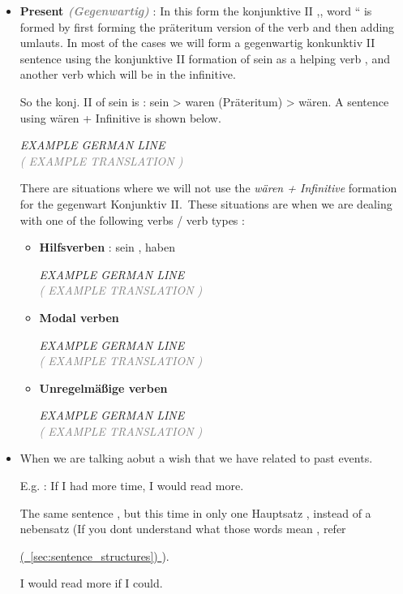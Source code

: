 \documentclass[a4paper,twocolumn,10pt]{article}
\newcommand{\newpar}
{\par \vspace{0.3cm}}
\newcommand{\refsec}[1]
{
	\hyperref[sec:#1]
	{
		(\textsection~\ref{sec:#1})
	}
}
\begin{document}
\begin{itemize}[noitemsep]

	\item \textbf{Present \textit{ \textcolor{gray}{(Gegenwartig)} } }: 
		In this form the konjunktive II ,, word `` is formed by first forming
		the präteritum version of the verb and then adding umlauts. In most of
		the cases we will form a gegenwartig konkunktiv II sentence using the
		konjunktive II formation of sein as a helping verb , and another verb
		which will be in the infinitive.\newpar

		So the konj. II of sein is : sein > waren (Präteritum) > wären. A
		sentence using wären + Infinitive is shown below.\newpar

		\noindent
		\textit{EXAMPLE GERMAN LINE}\\
		\textcolor{gray} { \textit{( EXAMPLE TRANSLATION )} } \newpar

		There are situations where we will not use the \textit{wären +
			Infinitive} formation for the gegenwart Konjunktiv II.\ These
		situations are when we are dealing with one of the following verbs /
		verb types :\newpar



		\begin{itemize}[noitemsep]
			\item \textbf{Hilfsverben} : sein , haben\newpar

\noindent
\textit{EXAMPLE GERMAN LINE}\\
\textcolor{gray} { \textit{( EXAMPLE TRANSLATION )} } \newpar

			\item \textbf{Modal verben}\newpar


\noindent
\textit{EXAMPLE GERMAN LINE}\\
\textcolor{gray} { \textit{( EXAMPLE TRANSLATION )} } \newpar


			\item \textbf{Unregelmäßige verben}\newpar


\noindent
\textit{EXAMPLE GERMAN LINE}\\
\textcolor{gray} { \textit{( EXAMPLE TRANSLATION )} } \newpar




		\end{itemize} 



		

	\item When we are talking aobut a wish that we have related to past events.

		E.g. : If I had more time, I would read more.\newpar

		The same sentence , but this time in only one Hauptsatz , instead of a
		nebensatz (If you dont understand what those words mean , refer
		\refsec{sentence_structures} ).\newpar

			I would read more if I could.

\end{itemize}
\end{document}
